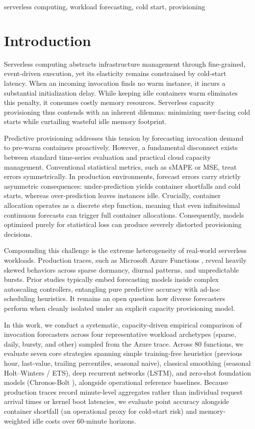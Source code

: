 \documentclass[conference,a4paper]{IEEEtran}
\begin{document}
\begin{IEEEkeywords}
serverless computing, workload forecasting, cold start, provisioning
\end{IEEEkeywords}

\section{Introduction}
\label{sec:introduction}
Serverless computing abstracts infrastructure management through fine-grained, event-driven execution, yet its elasticity remains constrained by cold-start latency. When an incoming invocation finds no warm instance, it incurs a substantial initialization delay. While keeping idle containers warm eliminates this penalty, it consumes costly memory resources. Serverless capacity provisioning thus contends with an inherent dilemma: minimizing user-facing cold starts while curtailing wasteful idle memory footprint.

Predictive provisioning addresses this tension by forecasting invocation demand to pre-warm containers proactively. However, a fundamental disconnect exists between standard time-series evaluation and practical cloud capacity management. Conventional statistical metrics, such as sMAPE or MSE, treat errors symmetrically. In production environments, forecast errors carry strictly asymmetric consequences: under-prediction yields container shortfalls and cold starts, whereas over-prediction leaves instances idle. Crucially, container allocation operates as a discrete step function, meaning that even infinitesimal continuous forecasts can trigger full container allocations. Consequently, models optimized purely for statistical loss can produce severely distorted provisioning decisions.

Compounding this challenge is the extreme heterogeneity of real-world serverless workloads. Production traces, such as Microsoft Azure Functions \cite{shahrad2020serverless}, reveal heavily skewed behaviors across sparse dormancy, diurnal patterns, and unpredictable bursts. Prior studies typically embed forecasting models inside complex autoscaling controllers, entangling pure predictive accuracy with ad-hoc scheduling heuristics. It remains an open question how diverse forecasters perform when cleanly isolated under an explicit capacity provisioning model.

In this work, we conduct a systematic, capacity-driven empirical comparison of invocation forecasters across four representative workload archetypes (sparse, daily, bursty, and other) sampled from the Azure trace. Across 80 functions, we evaluate seven core strategies spanning simple training-free heuristics (previous hour, last-value, trailing percentiles, seasonal naive), classical smoothing (seasonal Holt--Winters / ETS), deep recurrent networks (LSTM), and zero-shot foundation models (Chronos-Bolt \cite{ansari2024chronos}), alongside operational reference baselines. Because production traces record minute-level aggregates rather than individual request arrival times or kernel boot latencies, we evaluate point accuracy alongside container shortfall (an operational proxy for cold-start risk) and memory-weighted idle costs over 60-minute horizons.
\end{document}
